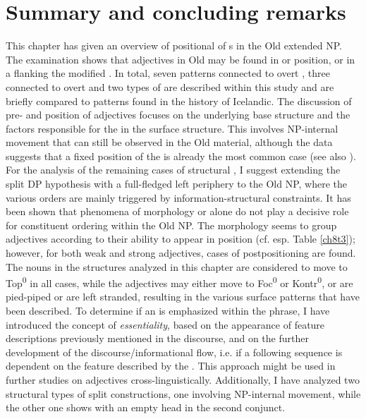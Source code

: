 \documentclass[output=paper,colorlinks,citecolor=brown]{langscibook}
\begin{document}
\section{Summary and concluding remarks}\label{ch8s5}
 This chapter has given an overview of positional  of 
s in the Old  extended NP. The examination shows
that  adjectives in Old  may be found in  or
 position, or in a  flanking the modified
. In total, seven patterns connected to overt , three
connected to overt  and two types of 
are described within this study and are briefly compared to patterns
found in the history of Icelandic. The discussion of pre- and
 position of adjectives focuses on the underlying base
structure and the factors responsible for the  in the surface
structure. This  involves NP-internal movement that can still
be observed in the Old   material, although the data
suggests that a fixed  position of the  is already
the most common case (see also ). For the analysis of the remaining cases of
structural , I suggest extending the split DP hypothesis with
a full-fledged left periphery to the Old  NP, where the
various orders are mainly triggered by information-structural
constraints. It has been shown that phenomena of morphology or
 alone do not play a decisive role for constituent
ordering within the Old  NP. The  morphology seems to
group  adjectives according to their ability to appear in
 position (cf. esp. Table \ref{ch8t3}); however, for both weak and
strong adjectives, cases of postpositioning are found. The nouns in the
structures analyzed in this chapter are considered to move to Top\textsuperscript{0} in
all cases, while the adjectives may either move to Foc\textsuperscript{0} or Kontr\textsuperscript{0}, or are pied-piped or are left stranded, resulting in the various surface patterns
that have been described. To determine if an  is emphasized
within the phrase, I have introduced the concept of \emph{essentiality}, based on the appearance of feature descriptions previously mentioned in
the discourse, and on the further development of the
discourse/informational flow, i.e. if a following sequence is dependent
on the feature described by the . This approach might be used
in further studies on adjectives cross-linguistically. Additionally, I
have analyzed two structural types of split constructions, one
involving NP-internal movement, while the other one shows
 with an empty head in the second conjunct.
\end{document}
